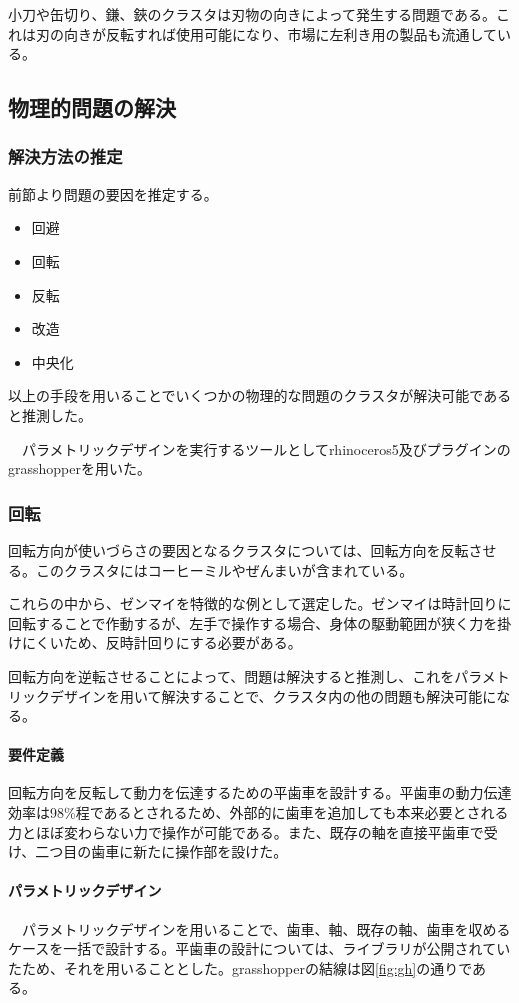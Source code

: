\documentclass{jsarticle}
\begin{document}
小刀や缶切り、鎌、鋏のクラスタは刃物の向きによって発生する問題である。これは刃の向きが反転すれば使用可能になり、市場に左利き用の製品も流通している。
\newpage
\subsection{物理的問題の解決}

\subsubsection{解決方法の推定}
前節より問題の要因を推定する。

\begin{itemize}
  \item{回避}
  \item{回転}
  \item{反転}
  \item{改造}
  \item{中央化}
\end{itemize}

以上の手段を用いることでいくつかの物理的な問題のクラスタが解決可能であると推測した。

　パラメトリックデザインを実行するツールとしてrhinoceros5及びプラグインのgrasshopperを用いた。

\subsubsection{回転}
回転方向が使いづらさの要因となるクラスタについては、回転方向を反転させる。このクラスタにはコーヒーミルやぜんまいが含まれている。

これらの中から、ゼンマイを特徴的な例として選定した。ゼンマイは時計回りに回転することで作動するが、左手で操作する場合、身体の駆動範囲が狭く力を掛けにくいため、反時計回りにする必要がある。

回転方向を逆転させることによって、問題は解決すると推測し、これをパラメトリックデザインを用いて解決することで、クラスタ内の他の問題も解決可能になる。

\paragraph{要件定義}
回転方向を反転して動力を伝達するための平歯車を設計する。平歯車の動力伝達効率は98\%程であるとされるため、外部的に歯車を追加しても本来必要とされる力とほぼ変わらない力で操作が可能である。また、既存の軸を直接平歯車で受け、二つ目の歯車に新たに操作部を設けた。

\paragraph{パラメトリックデザイン}
　パラメトリックデザインを用いることで、歯車、軸、既存の軸、歯車を収めるケースを一括で設計する。平歯車の設計については、ライブラリが公開されていたため、それを用いることとした。grasshopperの結線は図\ref{fig:gh}の通りである。
\end{document}
